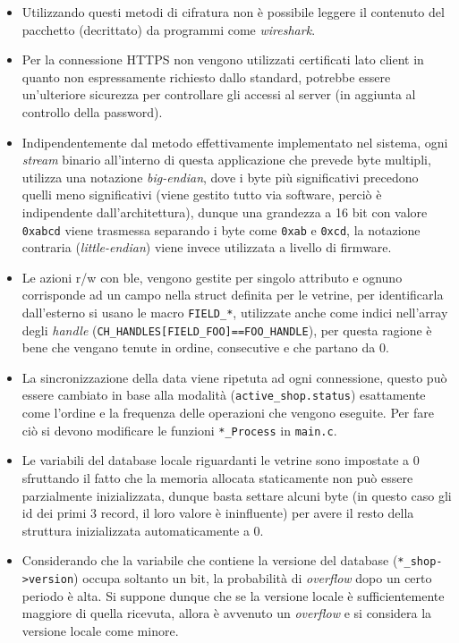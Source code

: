 \begin{itemize}
  \item Utilizzando questi metodi di cifratura non \`e possibile leggere il contenuto del pacchetto (decrittato) da programmi come \textit{wireshark}.
  \item Per la connessione HTTPS non vengono utilizzati certificati lato client in quanto non espressamente richiesto dallo standard, potrebbe essere un'ulteriore sicurezza per controllare gli accessi al server (in aggiunta al controllo della password).
  \item Indipendentemente dal metodo effettivamente implementato nel sistema, ogni \textit{stream} binario all'interno di questa applicazione che prevede byte multipli, utilizza una notazione \textit{big-endian}, dove i byte pi\`u significativi precedono quelli meno significativi (viene gestito tutto via software, perci\`o \`e indipendente dall'architettura), dunque una grandezza a 16 bit con valore \texttt{0xabcd} viene trasmessa separando i byte come \texttt{0xab} e \texttt{0xcd}, la notazione contraria (\textit{little-endian}) viene invece utilizzata a livello di firmware.
  \item Le azioni r/w con ble, vengono gestite per singolo attributo e ognuno corrisponde ad un campo nella struct definita per le vetrine, per identificarla dall'esterno si usano le macro \texttt{FIELD\_*}, utilizzate anche come indici nell'array degli \textit{handle} (\texttt{CH\_HANDLES[FIELD\_FOO]==FOO\_HANDLE}), per questa ragione \`e bene che vengano tenute in ordine, consecutive e che partano da 0.
  \item La sincronizzazione della data viene ripetuta ad ogni connessione, questo pu\`o essere cambiato in base alla modalit\`a (\texttt{active\_shop.status}) esattamente come l'ordine e la frequenza delle operazioni che vengono eseguite. Per fare ci\`o si devono modificare le funzioni \texttt{*\_Process} in \texttt{main.c}.
  \item Le variabili del database locale riguardanti le vetrine sono impostate a 0 sfruttando il fatto che la memoria allocata staticamente non pu\`o essere parzialmente inizializzata, dunque basta settare alcuni byte (in questo caso gli id dei primi 3 record, il loro valore \`e ininfluente) per avere il resto della struttura inizializzata automaticamente a 0.
  \item Considerando che la variabile che contiene la versione del database (\texttt{*\_shop->version}) occupa soltanto un bit, la probabilit\`a di \textit{overflow} dopo un certo periodo \`e alta. Si suppone dunque che se la versione locale \`e sufficientemente maggiore di quella ricevuta, allora \`e avvenuto un \textit{overflow} e si considera la versione locale come minore.

\end{itemize}
